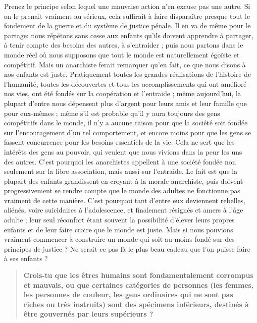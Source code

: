 Prenez le principe selon lequel une mauvaise action n'en excuse pas une autre. Si on le prenait vraiment au sérieux, cela suffirait à faire disparaître presque tout le fondement de la guerre et du système de justice pénale. Il en va de même pour le partage: nous répétons sans cesse aux enfants qu'ils doivent apprendre à partager, à tenir compte des besoins des autres, à s'entraider ; puis nous partons dans le monde réel où nous supposons que tout le monde est naturellement égoïste et compétitif. Mais un anarchiste ferait remarquer qu'en fait, ce que nous disons à nos enfants est juste. Pratiquement toutes les grandes réalisations de l'histoire de l'humanité, toutes les découvertes et tous les accomplissements qui ont amélioré nos vies, ont été fondés sur la coopération et l'entraide ; même aujourd'hui, la plupart d'entre nous dépensent plus d'argent pour leurs amis et leur famille que pour eux-mêmes ; même s'il est probable qu'il y aura toujours des gens compétitifs dans le monde, il n'y a aucune raison pour que la société soit fondée sur l'encouragement d'un tel comportement, et encore moins pour que les gens se fassent concurrence pour les besoins essentiels de la vie. Cela ne sert que les intérêts des gens au pouvoir, qui veulent que nous vivions dans la peur les uns des autres. C'est pourquoi les anarchistes appellent à une société fondée non seulement sur la libre association, mais aussi sur l'entraide. Le fait est que la plupart des enfants grandissent en croyant à la morale anarchiste, puis doivent progressivement se rendre compte que le monde des adultes ne fonctionne pas vraiment de cette manière. C'est pourquoi tant d'entre eux deviennent rebelles, aliénés, voire suicidaires à l'adolescence, et finalement résignés et amers à l'âge adulte ; leur seul réconfort étant souvent la possibilité d'élever leurs propres enfants et de leur faire croire que le monde est juste. Mais si nous pouvions vraiment commencer à construire un monde qui soit au moins fondé sur des principes de justice ? Ne serait-ce pas là le plus beau cadeau que l'on puisse faire à ses enfants ?

\begin{quotation}
\textbf{Crois-tu que les êtres humains sont fondamentalement corrompus et mauvais, ou que certaines catégories de personnes (les femmes, les personnes de couleur, les gens ordinaires qui ne sont pas riches ou très instruits) sont des spécimens inférieurs, destinés à être gouvernés par leurs supérieurs ?}
\end{quotation}

